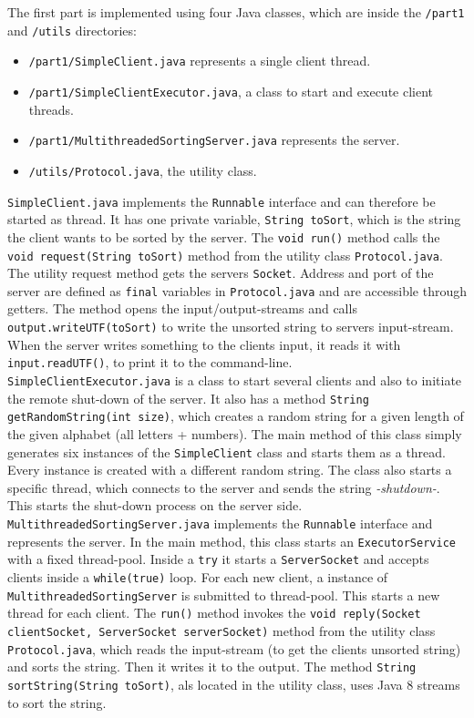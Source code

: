\documentclass{article}
\begin{document}
    The first part is implemented using four Java classes, which are inside the \texttt{/part1} and \texttt{/utils} directories:
    \begin{itemize}
      \item \texttt{/part1/SimpleClient.java} represents a single client thread.
      \item \texttt{/part1/SimpleClientExecutor.java}, a class to start and execute client threads.
      \item \texttt{/part1/MultithreadedSortingServer.java} represents the server.
      \item \texttt{/utils/Protocol.java}, the utility class.
    \end{itemize}
    \texttt{SimpleClient.java} implements the \texttt{Runnable} interface and can therefore be started as thread. It has one private variable, \texttt{String toSort}, which is the string the client wants to be sorted by the server. The \texttt{void run()} method calls the \texttt{void request(String toSort)} method from the utility class \texttt{Protocol.java}.\\
    The utility request method gets the servers \texttt{Socket}. Address and port of the server are defined as \texttt{final} variables in \texttt{Protocol.java} and are accessible through getters. The method opens the input/output-streams and calls \texttt{output.writeUTF(toSort)} to write the unsorted string to servers input-stream. When the server writes something to the clients input, it reads it with \texttt{input.readUTF()}, to print it to the command-line.\\
    \texttt{SimpleClientExecutor.java} is a class to start several clients and also to initiate the remote shut-down of the server. It also has a method \texttt{String getRandomString(int size)}, which creates a random string for a given length of the given alphabet (all letters + numbers). The main method of this class simply generates six instances of the \texttt{SimpleClient} class and starts them as a thread. Every instance is created with a different random string. The class also starts a specific thread, which connects to the server and sends the string \textit{-shutdown-}. This starts the shut-down process on the server side.\\
    \texttt{MultithreadedSortingServer.java} implements the \texttt{Runnable} interface and represents the server. In the main method, this class starts an \texttt{ExecutorService} with a fixed thread-pool. Inside a \texttt{try} it starts a \texttt{ServerSocket} and accepts clients inside a \texttt{while(true)} loop. For each new client, a instance of \texttt{MultithreadedSortingServer} is submitted to thread-pool. This starts a new thread for each client. The \texttt{run()} method invokes the \texttt{void reply(Socket clientSocket, ServerSocket serverSocket)} method from the utility class \texttt{Protocol.java}, which reads the input-stream (to get the clients unsorted string) and sorts the string. Then it writes it to the output. The method \texttt{String sortString(String toSort)}, als located in the utility class, uses Java 8 streams to sort the string.\\
\end{document}
